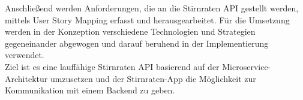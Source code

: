 Anschließend werden Anforderungen, die an die Stirnraten API gestellt werden, mittels User Story Mapping erfasst und herausgearbeitet. Für die Umsetzung werden in der Konzeption verschiedene Technologien und Strategien gegeneinander abgewogen und darauf beruhend in der Implementierung verwendet.\\ 

Ziel ist es eine lauffähige Stirnraten API basierend auf der Microservice-Architektur umzusetzen und der Stirnraten-App die Möglichkeit zur Kommunikation mit einem Backend zu geben. \\